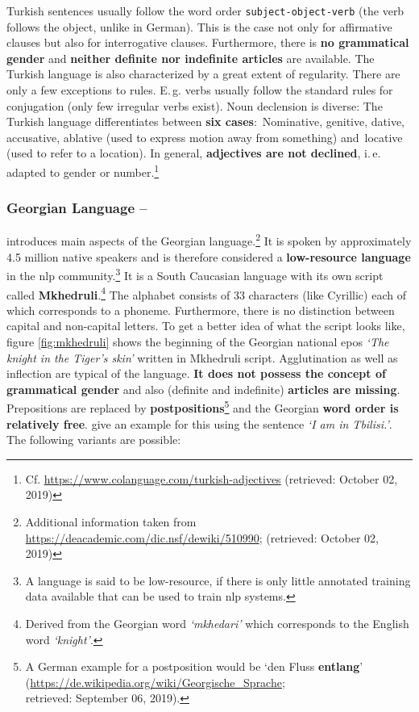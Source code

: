 Turkish sentences usually follow the word order \texttt{subject-object-verb} (the verb follows the object, unlike in German). This is the case not only for affirmative clauses but also for interrogative clauses. Furthermore, there is \textbf{no grammatical gender} and \textbf{neither definite nor indefinite articles} are available. The Turkish language is also characterized by a great extent of regularity. There are only a few exceptions to rules. E.\,g. verbs usually follow the standard rules for conjugation (only few irregular verbs exist). Noun declension is diverse: The Turkish language differentiates between \textbf{six cases}: \,Nominative,  genitive,  dative,  accusative,  ablative (used to express motion away from something) and \,locative (used to refer to a location). In general, \textbf{adjectives are not declined}, i.\,e. adapted to gender or number.\footnote{Cf. \url{https://www.colanguage.com/turkish-adjectives} (retrieved: October 02, 2019)}

\subsubsection{Georgian Language -- }
\label{sec:georgian_language}

\citep{Chapidze-Morgenroth.2015} introduces main aspects of the Georgian language.\footnote{Additional information taken from \url{https://deacademic.com/dic.nsf/dewiki/510990}; (retrieved: October 02, 2019)} It is spoken by approximately 4.5 million native speakers and is therefore considered a \textbf{low-resource language} in the \gls{nlp} community.\footnote{A language is said to be low-resource, if there is only little annotated training data available that can be used to train \gls{nlp} systems.} It is a South Caucasian language with its own script called \textbf{Mkhedruli}.\footnote{Derived from the Georgian word \textit{`mkhedari'} which corresponds to the English word \textit{`knight'}.} The alphabet consists of 33 characters (like Cyrillic) each of which corresponds to a phoneme. Furthermore, there is no distinction between capital and non-capital letters. To get a better idea of what the script looks like, figure \vref{fig:mkhedruli} shows the beginning of the Georgian national epos \textit{`The knight in the Tiger's skin'} written in Mkhedruli script. Agglutination as well as inflection are typical of the language. \textbf{It does not possess the concept of grammatical gender} and also (definite and indefinite) \textbf{articles are missing}. Prepositions are replaced by \textbf{postpositions}\footnote{A German example for a postposition would be `den Fluss \textbf{entlang}' (\url{https://de.wikipedia.org/wiki/Georgische_Sprache}; \\ retrieved: September 06, 2019).} and the Georgian \textbf{word order is relatively free}. \citep{Makharoblidze} give an example for this using the sentence \textit{`I am in Tbilisi.'}. The following variants are possible:

